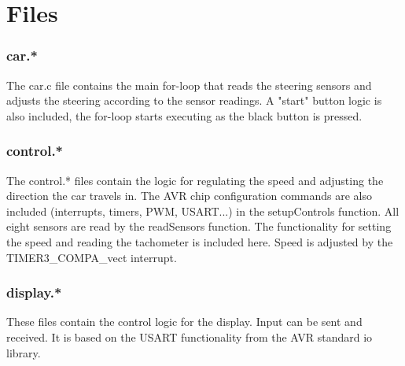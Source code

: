 \documentclass[11pt,a4paper]{report}
\begin{document}
\section*{Files}
\subsubsection*{car.*}
The car.c file contains the main for-loop that reads the steering sensors and adjusts the steering according to the sensor readings. A "start" button logic is also included, the for-loop starts executing as the black button is pressed.

\subsubsection*{control.*}
The control.* files contain the logic for regulating the speed and adjusting the direction the car travels in. The AVR chip configuration commands are also included (interrupts, timers, PWM, USART...) in the setupControls function. All eight sensors are read by the readSensors function. The functionality for setting the speed and reading the tachometer is included here. Speed is adjusted by the TIMER3\_COMPA\_vect interrupt.

\subsubsection*{display.*}
These files contain the control logic for the display. Input can be sent and received. It is based on the USART functionality from the AVR standard io library.
\end{document}
